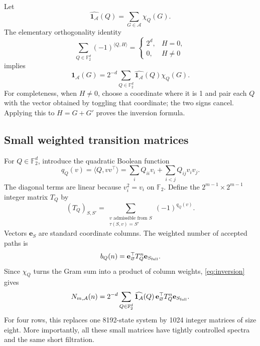 \documentclass[11pt,letterpaper]{article}
\theoremstyle{definition}
\newcommand{\F}{\mathbb F_2}
\newcommand{\1}{\mathbf 1}
\newcommand{\e}{\mathbf e}
\newcommand{\ip}[2]{\langle #1,#2\rangle}
\begin{document}
Let
\[
 \widehat{\1_{\mathcal A}}(Q)=\sum_{G\in\mathcal A}\chi_Q(G).
\]
The elementary orthogonality identity
\[
 \sum_{Q\in\F^d}(-1)^{\ip{Q}{H}}
 =\begin{cases}2^d,&H=0,\\0,&H\ne0\end{cases}
\]
implies
\begin{equation}\label{eq:inversion}
 \1_{\mathcal A}(G)
 =2^{-d}\sum_{Q\in\F^d}\widehat{\1_{\mathcal A}}(Q)\chi_Q(G).
\end{equation}
For completeness, when $H\ne0$, choose a coordinate where it is 1 and pair each
$Q$ with the vector obtained by toggling that coordinate; the two signs cancel.
Applying this to $H=G+G'$ proves the inversion formula.

\subsection{Small weighted transition matrices}
For $Q\in\F^d$, introduce the quadratic Boolean function
\begin{equation}\label{eq:qQ}
 q_Q(v)=\ip{Q}{vv^\top}
 =\sum_iQ_{ii}v_i+\sum_{i<j}Q_{ij}v_iv_j.
\end{equation}
The diagonal terms are linear because $v_i^2=v_i$ on $\F$.
Define the $2^{m-1}\times2^{m-1}$ integer matrix $T_Q$ by
\begin{equation}\label{eq:TQ}
 (T_Q)_{S,S'}=
 \sum_{\substack{v\text{ admissible from }S\\\tau(S,v)=S'}}(-1)^{q_Q(v)}.
\end{equation}
Vectors $\e_S$ are standard coordinate columns. The weighted number of
accepted paths is
\[
 b_Q(n)=\e_{\varnothing}^{\top}T_Q^n\e_{S_{\rm full}}.
\]
Since $\chi_Q$ turns the Gram sum into a product of column weights,
\eqref{eq:inversion} gives
\begin{equation}\label{eq:Fouriercount}
 N_{m,\mathcal A}(n)=2^{-d}
 \sum_{Q\in\F^d}\widehat{\1_{\mathcal A}}(Q)\,
 \e_{\varnothing}^{\top}T_Q^n\e_{S_{\rm full}}.
\end{equation}
For four rows, this replaces one 8192-state system by 1024 integer matrices of
size eight. More importantly, all these small matrices have tightly controlled
spectra and the same short filtration.
\end{document}
